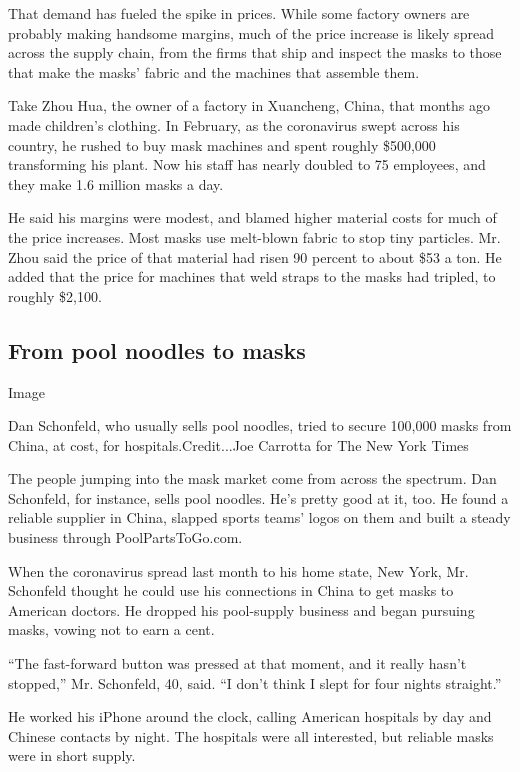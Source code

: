 That demand has fueled the spike in prices. While some factory owners
are probably making handsome margins, much of the price increase is
likely spread across the supply chain, from the firms that ship and
inspect the masks to those that make the masks' fabric and the machines
that assemble them.

Take Zhou Hua, the owner of a factory in Xuancheng, China, that months
ago made children's clothing. In February, as the coronavirus swept
across his country, he rushed to buy mask machines and spent roughly
\$500,000 transforming his plant. Now his staff has nearly doubled to 75
employees, and they make 1.6 million masks a day.

He said his margins were modest, and blamed higher material costs for
much of the price increases. Most masks use melt-blown fabric to stop
tiny particles. Mr. Zhou said the price of that material had risen 90
percent to about \$53 a ton. He added that the price for machines that
weld straps to the masks had tripled, to roughly \$2,100.

\hypertarget{from-pool-noodles-to-masks}{%
\subsection{From pool noodles to
masks}\label{from-pool-noodles-to-masks}}

Image

Dan Schonfeld, who usually sells pool noodles, tried to secure 100,000
masks from China, at cost, for hospitals.Credit...Joe Carrotta for The
New York Times

The people jumping into the mask market come from across the spectrum.
Dan Schonfeld, for instance, sells pool noodles. He's pretty good at it,
too. He found a reliable supplier in China, slapped sports teams' logos
on them and built a steady business through PoolPartsToGo.com.

When the coronavirus spread last month to his home state, New York, Mr.
Schonfeld thought he could use his connections in China to get masks to
American doctors. He dropped his pool-supply business and began pursuing
masks, vowing not to earn a cent.

``The fast-forward button was pressed at that moment, and it really
hasn't stopped,'' Mr. Schonfeld, 40, said. ``I don't think I slept for
four nights straight.''

He worked his iPhone around the clock, calling American hospitals by day
and Chinese contacts by night. The hospitals were all interested, but
reliable masks were in short supply.

